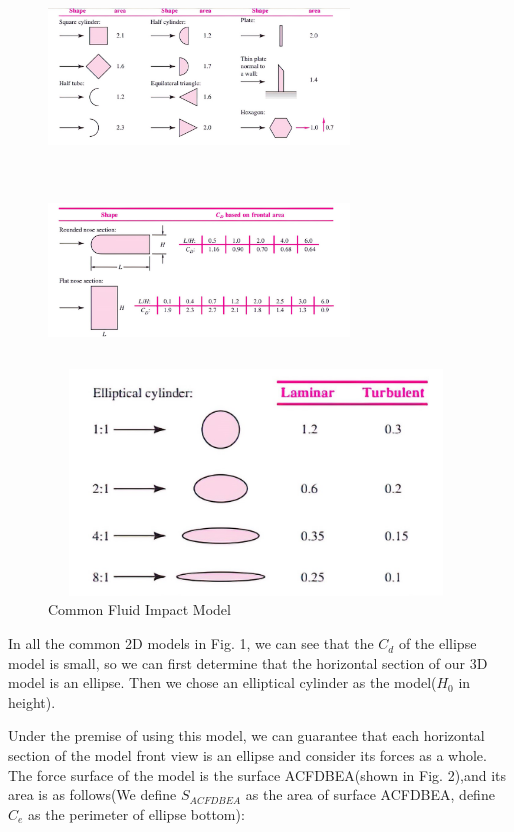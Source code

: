 \documentclass[13pt]{ctexart}
\begin{document}
	\begin{figure}[htb]
		\centering
		\begin{minipage}[c]{0.5\textwidth}
			\centering
			\includegraphics[height=5cm,width=8cm]{pink-polygon.jpg}
		\end{minipage}%
		\begin{minipage}[c]{0.5\textwidth}
			\centering
			\includegraphics[height=5cm,width=8cm]{pink-section.jpg}
		\end{minipage}
		\centering
		\includegraphics[height=6cm,width=11cm]{pink-oval.jpg}
		\caption{Common Fluid Impact Model}
	\end{figure}
	
	In all the common 2D models in Fig. 1, we can see that the $C_{d}$ of the ellipse model is small, so we can first determine that the horizontal section of our 3D model is an ellipse. Then we chose an elliptical cylinder as the model($H_0$ in height).
	
	Under the premise of using this model, we can guarantee that each horizontal section of the model front view is an ellipse and consider its forces as a whole. The force surface of the model is the surface ACFDBEA(shown in Fig. 2),and its area is as follows(We define $S_{ACFDBEA}$ as the area of surface ACFDBEA, define $C_e$ as the perimeter of ellipse bottom):
	
\end{document}
